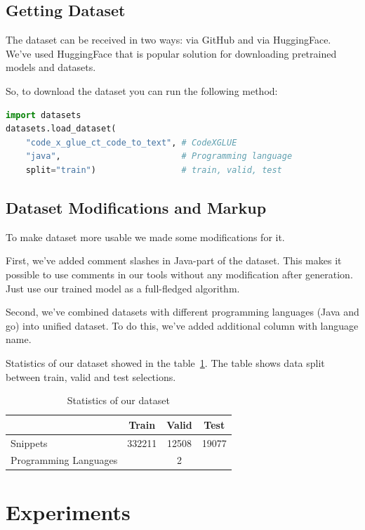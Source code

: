 \documentclass{article}
\begin{document}
\subsection{Getting Dataset}

The dataset can be received in two ways: via GitHub and via HuggingFace. We've used HuggingFace that is popular solution for downloading pretrained models and datasets.

So, to download the dataset you can run the following method:
\begin{lstlisting}[language=Python]
import datasets
datasets.load_dataset(
    "code_x_glue_ct_code_to_text", # CodeXGLUE
    "java",                        # Programming language
    split="train")                 # train, valid, test
\end{lstlisting}

\subsection{Dataset Modifications and Markup}

To make dataset more usable we made some modifications for it.

First, we've added comment slashes in Java-part of the dataset. This makes it possible to use comments in our tools without any modification after generation. Just use our trained model as a full-fledged algorithm.

Second, we've combined datasets with different programming languages (Java and go) into unified dataset. To do this, we've added additional column with language name.

Statistics of our dataset showed in the {table}~\ref{tab:statistics}. The table shows data split between train, valid and test selections.

\begin{table}[tbh!]
\begin{center}
\begin{tabular}[t]{|l|ccc|}
\hline
 & Train & Valid & Test \\
\hline
Snippets & 332211 & 12508 & 19077 \\
Programming Languages & & 2 & \\
\hline
\end{tabular}
\caption{Statistics of our dataset}
\label{tab:statistics}
\end{center}
\end{table}

\section{Experiments}
\end{document}
